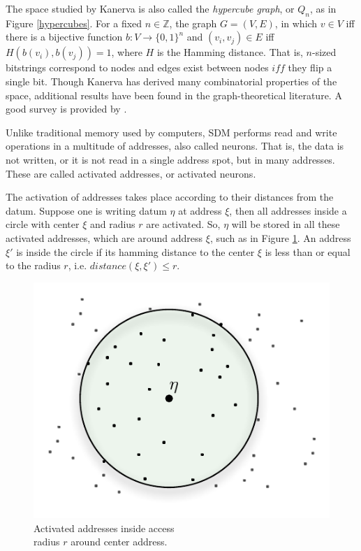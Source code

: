 The space studied by Kanerva is also called the \emph{hypercube graph}, or $Q_n$, as in Figure \ref{hypercubes}. For a fixed $n \in \mathbb{Z}$, the graph $G = (V, E)$, in which $v \in V$ iff there is a bijective function $b: V\to \{0,1\}^n$ and $(v_i, v_j) \in E$ iff $H(b(v_i), b(v_j))=1$, where $H$ is the Hamming distance. That is, $n$-sized bitstrings correspond to nodes and edges exist between nodes $iff$ they flip a single bit.  Though Kanerva has derived many combinatorial properties of the space, additional results have been found in the graph-theoretical literature. A good survey is provided by \citet{harary1988survey}.










Unlike traditional memory used by computers, SDM performs read and write operations in a multitude of addresses, also called neurons.  That is, the data is not written, or it is not read in a single address spot, but in many addresses. These are called activated addresses, or activated neurons.

The activation of addresses takes place according to their distances from the datum. Suppose one is writing datum $\eta$ at address $\xi$, then all addresses inside a circle with center $\xi$ and radius $r$ are activated. So, $\eta$ will be stored in all these activated addresses, which are around address $\xi$, such as in Figure \ref{fig-addresses-inside-access-radius}.  An address $\xi'$ is inside the circle if its hamming distance to the center $\xi$ is less than or equal to the radius $r$, i.e. $distance(\xi,\xi')\leq r$.

\begin{figure}[!htb]
\centering\includegraphics[scale=0.75]{./images02/p_circle_r.pdf}

\caption{Activated addresses inside access \protect \\
radius $r$ around center address.\label{fig-addresses-inside-access-radius}}
\end{figure}



